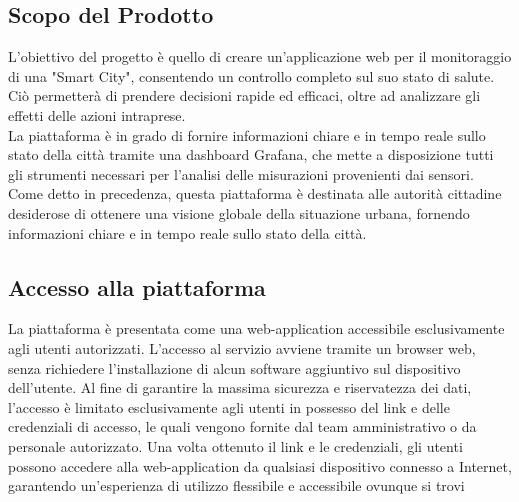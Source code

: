 \subsection{Scopo del Prodotto}
L'obiettivo del progetto è quello di creare un'applicazione web per il monitoraggio di una "Smart City", consentendo un controllo completo sul suo stato di salute. Ciò permetterà di prendere decisioni rapide ed efficaci, oltre ad analizzare gli effetti delle azioni intraprese.\\
La piattaforma è in grado di fornire informazioni chiare e in tempo reale sullo stato della città tramite una dashboard Grafana, che mette a disposizione tutti gli strumenti necessari per l'analisi delle misurazioni provenienti dai sensori.\\
Come detto in precedenza, questa piattaforma è destinata alle autorità cittadine desiderose di ottenere una visione globale della situazione urbana, fornendo informazioni chiare e in tempo reale sullo stato della città.

\subsection{Accesso alla piattaforma}
La piattaforma è presentata come una web-application accessibile esclusivamente agli utenti autorizzati. L'accesso al servizio avviene tramite un browser web, senza richiedere l'installazione di alcun software aggiuntivo sul dispositivo dell'utente. Al fine di garantire la massima sicurezza e riservatezza dei dati, l'accesso è limitato esclusivamente agli utenti in possesso del link e delle credenziali di accesso, le quali vengono fornite dal team amministrativo o da personale autorizzato. Una volta ottenuto il link e le credenziali, gli utenti possono accedere alla web-application da qualsiasi dispositivo connesso a Internet, garantendo un'esperienza di utilizzo flessibile e accessibile ovunque si trovi